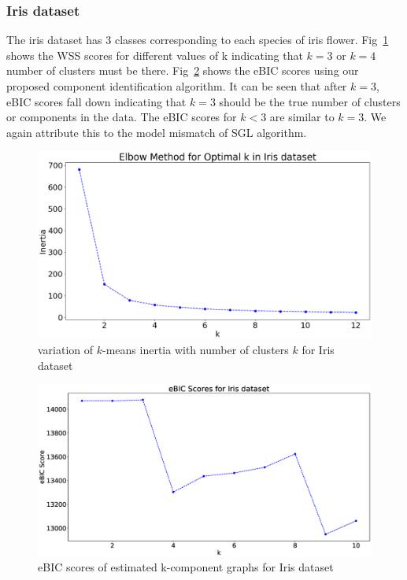 \subsubsection{Iris dataset}
The iris dataset has 3 classes corresponding to each species of iris flower. Fig~\ref{fig:kmeans-iris} shows the WSS scores for different values of k indicating that $k=3$ or $k=4$ number of clusters must be there. Fig~\ref{fig:gms-iris} shows the eBIC scores using our proposed component identification algorithm. It can be seen that after $k=3$, eBIC scores fall down indicating that $k=3$ should be the true number of clusters or components in the data. The eBIC scores for $k<3$ are similar to $k=3$. We again attribute this to the model mismatch of SGL algorithm. 
\begin{center}
	\begin{figure}[htpb]
		\includegraphics[scale=0.35]{Pictures/iris_kmeans}
		\caption{variation of $k$-means inertia with number of clusters $k$ for Iris dataset}
		\label{fig:kmeans-iris}
	\end{figure}
\end{center}

\begin{center}
	\begin{figure}[htpb]
		\includegraphics[scale=0.3]{Pictures/iris}
		\caption{eBIC scores of estimated k-component graphs for Iris dataset}
		\label{fig:gms-iris}
	\end{figure}
\end{center}

